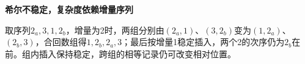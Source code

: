 {\color{ink}\bfseries 希尔不稳定，复杂度依赖增量序列}\par\vspace{1bp}取序列\(2_{a},\allowbreak{}3,\allowbreak{}1,\allowbreak{}2_{b}\)，增量为2时，两组分别由\((2_{a},\allowbreak{}1)\)、\((3,\allowbreak{}2_{b})\)变为\((1,\allowbreak{}2_{a})\)、\((2_{b},\allowbreak{}3)\)，合回数组得\(1,\allowbreak{}2_{b},\allowbreak{}2_{a},\allowbreak{}3\)；最后按增量1稳定插入，两个2的次序仍为\(2_{b}\)在前。组内插入保持稳定，跨组的相等记录仍可改变相对位置。
